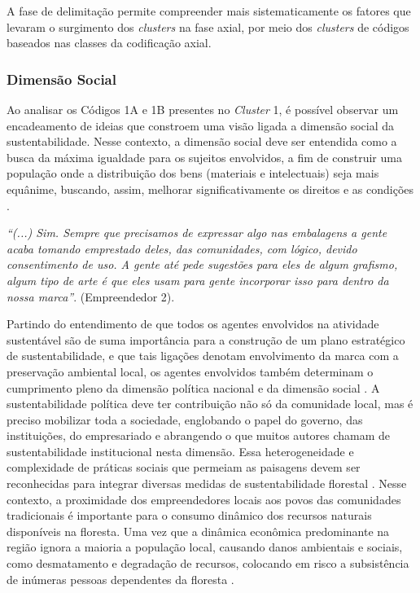 A fase de delimitação permite compreender mais sistematicamente os fatores que levaram o surgimento dos \textit{clusters} na fase axial, por meio dos \textit{clusters} de códigos baseados nas classes da codificação axial. 

\subsubsection*{Dimensão Social}

Ao analisar os Códigos 1A e 1B presentes no \textit{Cluster} 1, é possível observar um encadeamento de ideias que constroem uma visão ligada a dimensão social da sustentabilidade. Nesse contexto, a dimensão social deve ser entendida como a busca da máxima igualdade para os sujeitos envolvidos, a fim de construir uma população onde a distribuição dos bens (materiais e intelectuais) seja mais equânime, buscando, assim, melhorar significativamente os direitos e as condições \cite{Quimby2018ParticipationComanagement}. 

\textit{“(...) Sim. Sempre que precisamos de expressar algo nas embalagens a gente acaba tomando emprestado deles, das comunidades, com lógico, devido consentimento de uso. A gente até pede sugestões para eles de algum grafismo, algum tipo de arte é que eles usam para gente incorporar isso para dentro da nossa marca”}. (Empreendedor 2).


Partindo do entendimento de que todos os agentes envolvidos na atividade sustentável são de suma importância para a construção de um plano estratégico de sustentabilidade, e que tais ligações denotam envolvimento da marca com a preservação ambiental local, os agentes envolvidos também determinam o cumprimento pleno da dimensão política nacional e da dimensão social \cite{Sachs1993EstrategiasXXI}. A sustentabilidade política deve ter contribuição não só da comunidade local, mas é preciso mobilizar toda a sociedade, englobando o papel do governo, das instituições, do empresariado e abrangendo o que muitos autores chamam de sustentabilidade institucional nesta dimensão. Essa heterogeneidade e complexidade de práticas sociais que permeiam as paisagens devem ser reconhecidas para integrar diversas medidas de sustentabilidade florestal \cite{Gebara2019DeconstructingApproach}. Nesse contexto, a proximidade dos empreendedores locais aos povos das comunidades tradicionais é importante para o consumo dinâmico dos recursos naturais disponíveis na floresta. Uma vez que a dinâmica econômica predominante na região ignora a maioria a população local, causando danos ambientais e sociais, como desmatamento e degradação de recursos, colocando em risco a subsistência de inúmeras pessoas dependentes da floresta \cite{Pokorny2013FromPoverty,Godar2014Actor-specificAmazon}.

